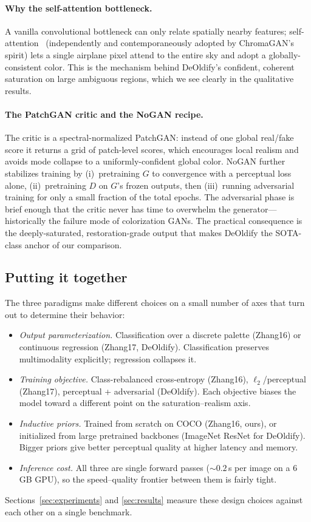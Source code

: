 \paragraph{Why the self-attention bottleneck.}
A vanilla convolutional bottleneck can only relate spatially nearby features;
self-attention~\cite{vitoria2020chromagan} (independently and contemporaneously
adopted by ChromaGAN's spirit) lets a single airplane pixel attend to the
entire sky and adopt a globally-consistent color. This is the mechanism behind
DeOldify's confident, coherent saturation on large ambiguous regions, which we
see clearly in the qualitative results.

\paragraph{The PatchGAN critic and the NoGAN recipe.}
The critic is a spectral-normalized PatchGAN: instead of one global real/fake
score it returns a grid of patch-level scores, which encourages local realism
and avoids mode collapse to a uniformly-confident global color. NoGAN further
stabilizes training by (i)~pretraining $G$ to convergence with a perceptual
loss alone, (ii)~pretraining $D$ on $G$'s frozen outputs, then (iii)~running
adversarial training for only a small fraction of the total epochs. The
adversarial phase is brief enough that the critic never has time to overwhelm
the generator---historically the failure mode of colorization GANs. The
practical consequence is the deeply-saturated, restoration-grade output that
makes DeOldify the SOTA-class anchor of our comparison.

\subsection{Putting it together}
The three paradigms make different choices on a small number of axes that turn
out to determine their behavior:
\begin{itemize}
  \item \emph{Output parameterization.} Classification over a discrete palette
        (Zhang16) or continuous regression (Zhang17, DeOldify). Classification
        preserves multimodality explicitly; regression collapses it.
  \item \emph{Training objective.} Class-rebalanced cross-entropy (Zhang16),
        $\ell_2$/perceptual (Zhang17), perceptual + adversarial (DeOldify).
        Each objective biases the model toward a different point on the
        saturation--realism axis.
  \item \emph{Inductive priors.} Trained from scratch on COCO (Zhang16, ours),
        or initialized from large pretrained backbones (ImageNet ResNet for
        DeOldify). Bigger priors give better perceptual quality at higher
        latency and memory.
  \item \emph{Inference cost.} All three are single forward passes
        (${\sim}0.2$\,s per image on a 6\,GB GPU), so the speed--quality
        frontier between them is fairly tight.
\end{itemize}
Sections~\ref{sec:experiments} and \ref{sec:results} measure these design
choices against each other on a single benchmark.
